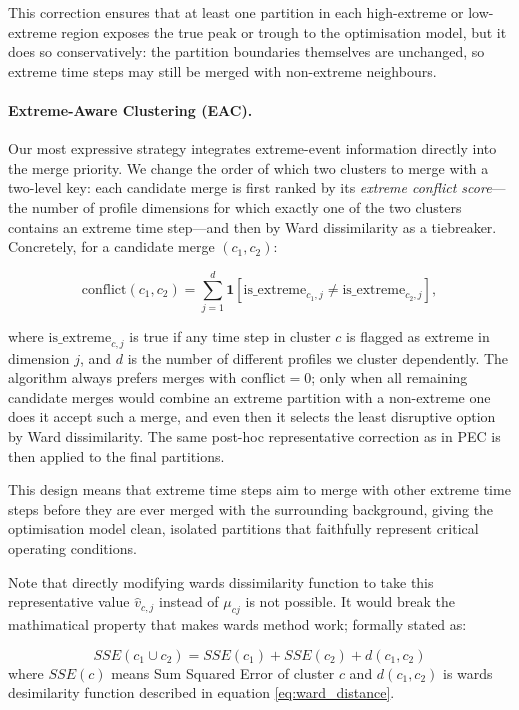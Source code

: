 This correction ensures that at least one partition in each high-extreme or 
low-extreme region exposes the true peak or trough to the optimisation model, 
but it does so conservatively: the partition boundaries themselves are unchanged, 
so extreme time steps may still be merged with non-extreme neighbours.

\paragraph{Extreme-Aware Clustering (EAC).}
Our most expressive strategy integrates extreme-event information directly into 
the merge priority. We change the order of which two clusters to merge with a two-level key: each 
candidate merge is first ranked by its \emph{extreme conflict score}---the 
number of profile dimensions for which exactly one of the two clusters contains 
an extreme time step---and then by Ward dissimilarity as a tiebreaker. 
Concretely, for a candidate merge $(c_1, c_2)$:

\[
\text{conflict}(c_1, c_2) = \sum_{j=1}^{d} \mathbf{1}\!\left[ 
    \text{is\_extreme}_{c_1,j} \neq \text{is\_extreme}_{c_2,j} 
\right],
\]

where $\text{is\_extreme}_{c,j}$ is true if any time step in cluster $c$ is 
flagged as extreme in dimension $j$, and $d$ is the number of different profiles we cluster dependently. The algorithm always prefers merges with $\text{conflict} = 0$; only when all remaining candidate merges would combine an extreme partition with a non-extreme one does it accept such a merge, and even then it selects the least disruptive option by Ward dissimilarity. The same post-hoc representative correction as in PEC is then applied to the final partitions.

This design means that extreme time steps aim to merge with 
other extreme time steps before they are ever merged with the surrounding 
background, giving the optimisation model clean, isolated partitions that 
faithfully represent critical operating conditions.

Note that directly modifying wards dissimilarity function to take this representative value $\hat{v}_{c,j}$ instead of $\mu_{cj}$ is not possible. It would break the mathimatical property that makes wards method work; formally stated as:

\[
SSE(c_1 \cup c_2) = SSE(c_1) + SSE(c_2) + d(c_1,c_2)
\]
\noindent
where $SSE(c)$ means Sum Squared Error of cluster $c$ and $d(c_1,c_2)$ is wards desimilarity function described in equation \ref{eq:ward_distance}.

